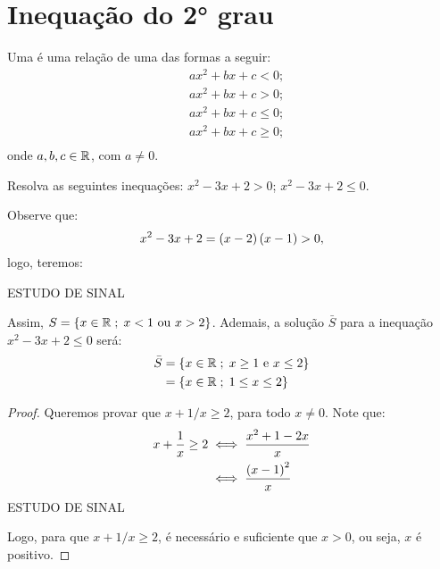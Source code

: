 \section{Inequação do 2° grau}

\begin{definition}
Uma  é uma relação de uma das formas
a seguir:
%
\begin{align*}
& ax^2 +bx + c <0;\\
& ax^2 +bx + c>0;\\
& ax^2 +bx + c \le 0;\\
& ax^2 +bx + c \ge 0;\\
\end{align*}
%
onde $a, b, c \in \mathbb{R}$, com $ a \ne 0$.
\end{definition}

\begin{example}
Resolva as seguintes inequações: $x^2 -3x +2 > 0$; $x^2 -3x +2 \le 0$.
\end{example}
\begin{solution}
Observe que: 
\[
	x^2-3x+2=\left(x-2\right)\left(x-1\right)>0,
\]
logo, teremos:

{\huge ESTUDO DE SINAL}

Assim, $S = \left\{x \in \mathbb{R} \;;\;{x<1 \text{ ou } x>2}\right\}$. Ademais, a solução $\bar{S}$ para a inequação $x^2-3x+2\le0$ será:
%
\begin{align*}
\bar{S} &= \left\{x \in \mathbb{R} \;;\; x \ge 1 \text{ e } x \le 2\right\} \\
		&= \left\{x \in \mathbb{R} \;;\; 1 \le x \le 2\right\} 
\end{align*}
\end{solution}

\begin{proof}
Queremos provar que $x+1/x\ge 2$, para todo $x \ne 0$. Note que:
%
\begin{align*}
x+\dfrac{1}{x}\ge 2 &\iff \dfrac{x^2+1-2x}{x} \\
		&\iff \dfrac{\left(x-1\right)^2}{x}
\end{align*}
{\huge ESTUDO DE SINAL}

Logo, para que $x+1/x\ge 2$, é necessário e suficiente que $x > 0$, ou seja, $x$ é positivo.
\end{proof}
